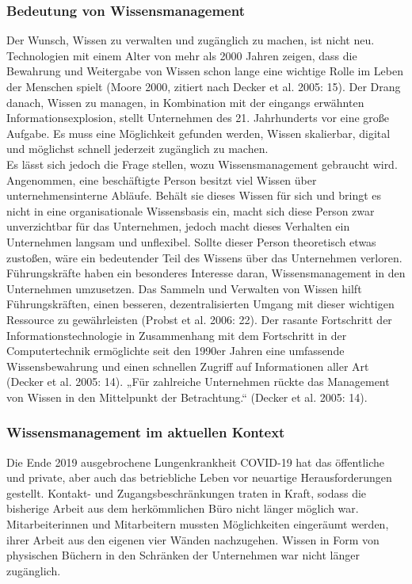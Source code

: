 \documentclass[a4paper]{scrartcl}
\begin{document}
\subsubsection{Bedeutung von Wissensmanagement}
Der Wunsch, Wissen zu verwalten und zugänglich zu machen, ist nicht neu. Technologien mit einem Alter von mehr als 2000 Jahren zeigen, dass die Bewahrung und Weitergabe von Wissen schon lange eine wichtige Rolle im Leben der Menschen spielt (Moore 2000, zitiert nach Decker et al. 2005: 15). Der Drang danach, Wissen zu managen, in Kombination mit der eingangs erwähnten Informationsexplosion, stellt Unternehmen des 21. Jahrhunderts vor eine große Aufgabe. Es muss eine Möglichkeit gefunden werden, Wissen skalierbar, digital und möglichst schnell jederzeit zugänglich zu machen. \\
Es lässt sich jedoch die Frage stellen, wozu Wissensmanagement gebraucht wird. Angenommen, eine beschäftigte Person besitzt viel Wissen über unternehmensinterne Abläufe. Behält sie dieses Wissen für sich und bringt es nicht in eine organisationale Wissensbasis ein, macht sich diese Person zwar unverzichtbar für das Unternehmen, jedoch macht dieses Verhalten ein Unternehmen langsam und unflexibel. Sollte dieser Person theoretisch etwas zustoßen, wäre ein bedeutender Teil des Wissens über das Unternehmen verloren. \\
Führungskräfte haben ein besonderes Interesse daran, Wissensmanagement in den Unternehmen umzusetzen. Das Sammeln und Verwalten von Wissen hilft Führungskräften, einen besseren, dezentralisierten Umgang mit dieser wichtigen Ressource zu gewährleisten (Probst et al. 2006: 22). Der rasante Fortschritt der Informationstechnologie in Zusammenhang mit dem Fortschritt in der Computertechnik ermöglichte seit den 1990er Jahren eine umfassende Wissensbewahrung und einen schnellen Zugriff auf Informationen aller Art (Decker et al. 2005: 14). „Für zahlreiche Unternehmen rückte das Management von Wissen in den Mittelpunkt der Betrachtung.“ (Decker et al. 2005: 14).

\subsubsection{Wissensmanagement im aktuellen Kontext}
Die Ende 2019 ausgebrochene Lungenkrankheit COVID-19 hat das öffentliche und private, aber auch das betriebliche Leben vor neuartige Herausforderungen gestellt. Kontakt- und Zugangsbeschränkungen traten in Kraft, sodass die bisherige Arbeit aus dem herkömmlichen Büro nicht länger möglich war. Mitarbeiterinnen und Mitarbeitern mussten Möglichkeiten eingeräumt werden, ihrer Arbeit aus den eigenen vier Wänden nachzugehen. Wissen in Form von physischen Büchern in den Schränken der Unternehmen war nicht länger zugänglich.
\end{document}

